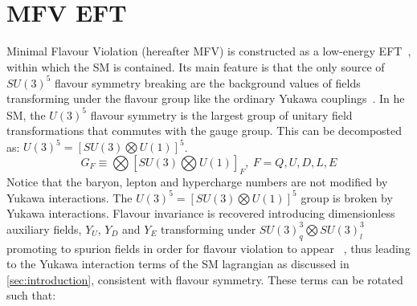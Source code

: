 \section{MFV EFT}
\label{sec:MFVEFT}
Minimal Flavour Violation (hereafter MFV) is constructed as a low-energy EFT~\cite{DAmbrosio:2002vsn}, within which the SM is contained. Its main feature is that the only source of $SU(3)^5$ flavour symmetry breaking are the background values of fields transforming under the flavour group like the ordinary Yukawa couplings~\cite{DAmbrosio:2002vsn}. 
In he SM, the $U(3)^5$ flavour symmetry is the largest group of unitary field transformations that commutes with the gauge group. This can be decomposted~\cite{DAmbrosio:2002vsn} as: $U(3)^5 = [SU(3) \bigotimes U(1)]^5$.
\begin{equation}
G_F \equiv \bigotimes [SU(3) \bigotimes U(1)]_F, \ F=Q,U,D,L,E
\end{equation}
Notice that the baryon, lepton and hypercharge numbers are not modified by Yukawa interactions. %
The $U(3)^5 = [SU(3) \bigotimes U(1)]^5$ group is broken by Yukawa interactions. Flavour invariance is recovered introducing dimensionless auxiliary fields, $Y_U$, $Y_D$ and $Y_E$ transforming under $SU(3)_q^3 \bigotimes SU(3)_l^3$ promoting to spurion fields in order for flavour violation to appear ~\cite{Altmannshofer:2007cs}, thus leading to the Yukawa interaction terms of the SM lagrangian as discussed in \ref{sec:introduction}, consistent with flavour symmetry. These terms can be rotated such that: %

